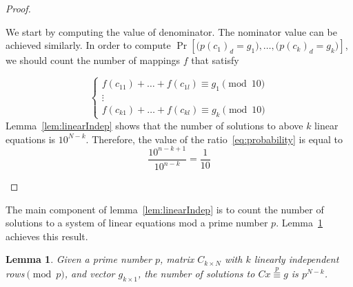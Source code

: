 \documentclass{article}
\newtheorem{lemma}[theorem]{Lemma}
\begin{document}
\begin{proof}
\begin{itemize}
	We start by computing the value of denominator. The nominator value can be achieved similarly. In order to compute $\Pr[\big(p(c_1)_d=g_1\big),\ldots, \big(p(c_k)_d=g_k\big)]$, we should count the number of mappings $f$ that satisfy 
	
	\begin{equation}
	\label{linearSet}
	\left\{ \begin{array}{l}
     f(c_{11})+\ldots+ f(c_{1l})\equiv g_1 \pmod{10}\\
     \vdots       \\
     f(c_{k1})+\ldots+ f(c_{kl})\equiv g_{k} \pmod{10}
    \end{array} \right.	
	\end{equation}
Lemma~\ref{lem:linearIndep} shows that the number of solutions to above $k$ linear equations is $10^{N-{k}}$. Therefore, the value of the ratio~\eqref{eq:probability} is equal to
$$
\frac{10^{n-{k+1}}}{10^{n-k}} = \frac{1}{10}
$$
\end{itemize}
\end{proof}
The main component of lemma~\ref{lem:linearIndep} is to count the number of solutions to a system of linear equations mod a prime number $p$. Lemma~\ref{lem:linearIndepp} achieves this result.


\begin{lemma}
\label{lem:linearIndepp}
Given a prime number $p$, matrix $C_{k\times N}$ with $k$ linearly independent rows$\pmod{p}$, and vector ${g}_{k\times 1}$, the number of solutions to $C{x} \overset{p}{\equiv} {g}$ is $p^{N-k}$.
\end{lemma}
\end{document}
